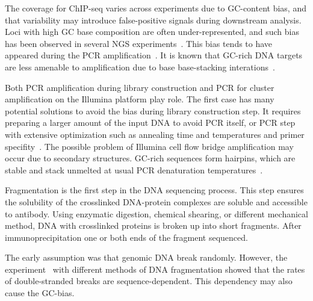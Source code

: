 
The coverage for ChIP-seq varies across experiments due to GC-content bias, and that variability may introduce false-positive signals during downstream analysis.
Loci with high GC base composition are often under-represented, and such bias has been observed in several NGS experiments~\cite{benjamini2012summarizing,dohm2008substantial,teng2017accounting}.
This bias tends to have appeared during the PCR amplification~\cite{ross2013characterizing}.
It is known that GC-rich DNA targets are less amenable to amplification due to base base-stacking interations~\cite{yakovchuk2006base}.

Both PCR amplification during library construction and PCR for cluster amplification on the Illumina platform play role. 
The first case has many potential solutions to avoid the bias during library construction step.
It requires preparing a larger amount of the input DNA to avoid PCR itself, or PCR step with extensive optimization such as annealing time and temperatures and primer specifity~\cite{aird2011analyzing}.
The possible problem of Illumina cell flow bridge amplification may occur due to secondary structures.
GC-rich sequences form hairpins, which are stable and stack unmelted at usual PCR denaturation temperatures~\cite{stein2010nucleosome}.

Fragmentation is the first step in the DNA sequencing process.
This step ensures the solubility of the crosslinked DNA-protein complexes are soluble and accessible to antibody.
Using enzymatic digestion, chemical shearing, or different mechanical method, DNA with crosslinked proteins is broken up into short fragments.
After immunoprecipitation one or both ends of the fragment sequenced.

The early assumption was that genomic DNA break randomly.
However, the experiment~\cite{poptsova2014non} with different methods of DNA fragmentation showed that the rates of double-stranded breaks are sequence-dependent.
This dependency may also cause the GC-bias. 

